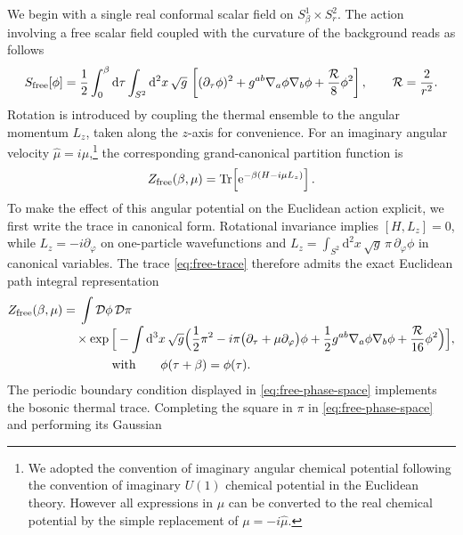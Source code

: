 \documentclass[a4paper,11pt]{article}
\newcommand{\e}{\mathrm e}
\newcommand{\dd}{\mathrm d}
\begin{document}
We begin with a single real conformal scalar field on
$S^1_\beta\times S^2_r$. 
The action involving a free  scalar field coupled with the curvature of the background reads as follows
\begin{equation}
 S_{\rm free}[\phi]
 =\frac12\int_0^\beta\dd\tau\int_{S^2}\dd^2x\,\sqrt g\,
 \left[
 (\partial_\tau\phi)^2+g^{ab}\nabla_a\phi\nabla_b\phi
 +\frac{\mathcal R}{8}\phi^2
 \right],
 \qquad \mathcal R=\frac{2}{r^2}.
 \label{eq:free-action}
\end{equation}
Rotation is introduced by coupling the thermal ensemble to the
angular momentum $L_z$, taken along the $z$-axis for convenience.  For an imaginary angular velocity $\hat\mu=i\mu$,\footnote{We adopted the convention of imaginary angular chemical potential following the convention of imaginary $U(1)$ chemical 
	potential in the Euclidean theory. However all expressions in $\mu$  can be converted to  the real chemical potential 
	by the simple replacement of $\mu = - i \hat \mu$. } the
corresponding grand-canonical partition function is
\begin{equation}
 Z_{\rm free}(\beta,\mu)
 =\operatorname{Tr}\!\left[\e^{-\beta(H-i\mu L_z)}\right].
 \label{eq:free-trace}
\end{equation}
To make the effect of this angular potential on the Euclidean action
explicit, we first write the trace in canonical form.  Rotational invariance
implies $[H,L_z]=0$, while $L_z=-i\partial_\varphi$ on one-particle
wavefunctions and
$L_z=\int_{S^2}\dd^2x\,\sqrt g\,\pi\,\partial_\varphi\phi$ in canonical
variables.  The trace \eqref{eq:free-trace} therefore admits the exact
Euclidean path integral representation
\begin{align}
 Z_{\rm free}(\beta,\mu)
 &={}\int\mathcal D\phi\,\mathcal D\pi\,
 \nonumber\\[-1mm]
 &\quad\times
 \exp\Big[-\int\dd^3x\,\sqrt g
 \Big(
 \frac12\pi^2
 -i\pi\bigl(\partial_\tau+\mu\partial_\varphi\bigr)\phi
 +\frac12 g^{ab}\nabla_a\phi\nabla_b\phi
 +\frac{\mathcal R}{16}\phi^2
 \Big)\Big],\nonumber\\
&\qquad\qquad {\rm with} \qquad\phi(\tau+\beta)=\phi(\tau).
 \label{eq:free-phase-space}
\end{align}
The periodic boundary condition displayed in
\eqref{eq:free-phase-space} implements the bosonic thermal trace.  Completing
the square in $\pi$ in \eqref{eq:free-phase-space} and performing its Gaussian
\end{document}
